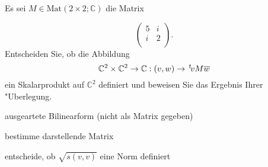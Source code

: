 \documentclass[a4,11pt]{article}
\begin{document}
\newpage

\begin{aufgabe}

Es sei $M \in \text{Mat}(2 \times 2 ; \mathbb{C})$ die Matrix

\[
\begin{pmatrix}
5 & i\\
i & 2 \\
\end{pmatrix}.
\]
Entscheiden Sie, ob die Abbildung
\[
\mathbb{C}^2 \times \mathbb{C}^2 \rightarrow \mathbb{C} : (v, w) \rightarrow \,^t\!vM \overline{w} 
\]
ein Skalarprodukt auf $\mathbb{C}^2$ definiert und beweisen Sie das Ergebnis Ihrer "Uberlegung.

\end{aufgabe}


\begin{aufgabe}
  ausgeartete Bilinearform (nicht als Matrix gegeben)

  bestimme darstellende Matrix

  entscheide, ob $\sqrt{s(v,v)}$ eine Norm definiert
\end{aufgabe}
\end{document}
